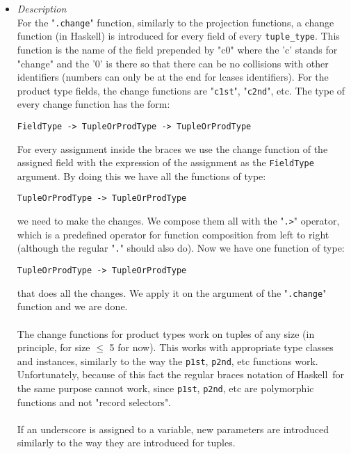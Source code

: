 \documentclass[diploma]{softlab-thesis}
\def\H{Haskell}
\begin{document}
\begin{itemize}
\begin{itemize}
\item
\textit{Description}\\

For the "\texttt{.change}" function, similarly to the projection functions, a
change function (in \H) is introduced for every field of every
\verb|tuple_type|. This function is the name of the field prepended by "c0"
where the 'c' stands for "change" and the '0' is there so that there can be no
collisions with other identifiers (numbers can only be at the end for lcases
identifiers). For the product type fields, the change functions are
"\texttt{c1st}", "\texttt{c2nd}", etc. The type of every change function
has the form:
\begin{verbatim}
FieldType -> TupleOrProdType -> TupleOrProdType
\end{verbatim}

For every assignment inside the braces we use the change function of the
assigned field with the expression of the assignment as the
\texttt{FieldType} argument. By doing this we have all the functions
of type:
\begin{verbatim}
TupleOrProdType -> TupleOrProdType
\end{verbatim}

we need to make the changes. We compose them all with the "\texttt{.>}"
operator, which is a predefined operator for function composition from left to
right (although the regular "\texttt{.}" should also do). Now we have one
function of type:
\begin{verbatim}
TupleOrProdType -> TupleOrProdType
\end{verbatim}

that does all the changes. We apply it on the argument of the
"\texttt{.change}" function and we are done.
\\\\
The change functions for product types work on tuples of any size
(in principle, for size $\leq$ 5 for now). This works with appropriate type
classes and instances, similarly to the way the \texttt{p1st}, \texttt{p2nd},
etc functions work. Unfortunately, because of this fact the regular braces
notation of \H\ for the same purpose cannot work, since \texttt{p1st},
\texttt{p2nd}, etc are polymorphic functions and not "record selectors".
\\\\
If an underscore is assigned to a variable, new parameters are introduced
similarly to the way they are introduced for tuples.

\end{itemize}

\end{itemize}
\end{document}
